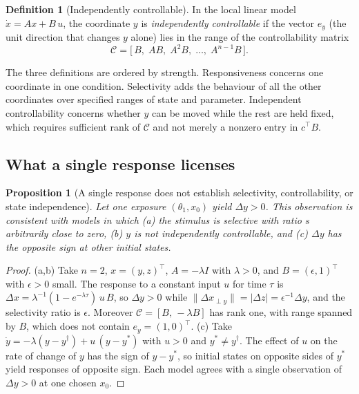 \documentclass[11pt]{article}
\theoremstyle{plain}
\newtheorem{proposition}{Proposition}
\theoremstyle{definition}
\newtheorem{definition}{Definition}
\theoremstyle{remark}
\begin{document}
\begin{definition}[Independently controllable]
In the local linear model $\dot x=Ax+B\,u$, the coordinate $y$ is \emph{independently controllable} if the vector $e_y$ (the unit direction that changes $y$ alone) lies in the range of the controllability matrix
\begin{equation}
\mathcal C=\bigl[\,B,\;AB,\;A^2B,\;\dots,\;A^{n-1}B\,\bigr].
\end{equation}
\end{definition}

The three definitions are ordered by strength. Responsiveness concerns one coordinate in one condition. Selectivity adds the behaviour of all the other coordinates over specified ranges of state and parameter. Independent controllability concerns whether $y$ can be moved while the rest are held fixed, which requires sufficient rank of $\mathcal C$ and not merely a nonzero entry in $c^\top B$.

\subsection{What a single response licenses}

\begin{proposition}[A single response does not establish selectivity, controllability, or state independence]
\label{prop:single}
Let one exposure $(\theta_1,x_0)$ yield $\Delta y>0$. This observation is consistent with models in which (a) the stimulus is selective with ratio $s$ arbitrarily close to zero, (b) $y$ is not independently controllable, and (c) $\Delta y$ has the opposite sign at other initial states.
\end{proposition}

\begin{proof}
(a,b) Take $n=2$, $x=(y,z)^\top$, $A=-\lambda I$ with $\lambda>0$, and $B=(\epsilon,1)^\top$ with $\epsilon>0$ small. The response to a constant input $u$ for time $\tau$ is $\Delta x=\lambda^{-1}(1-e^{-\lambda\tau})\,u\,B$, so $\Delta y>0$ while $\|\Delta x_{\perp y}\|=|\Delta z|=\epsilon^{-1}\Delta y$, and the selectivity ratio is $\epsilon$. Moreover $\mathcal C=[B,\,-\lambda B]$ has rank one, with range spanned by $B$, which does not contain $e_y=(1,0)^\top$. (c) Take $\dot y=-\lambda(y-y^\dagger)+u\,(y-y^*)$ with $u>0$ and $y^*\ne y^\dagger$. The effect of $u$ on the rate of change of $y$ has the sign of $y-y^*$, so initial states on opposite sides of $y^*$ yield responses of opposite sign. Each model agrees with a single observation of $\Delta y>0$ at one chosen $x_0$.
\end{proof}
\end{document}
